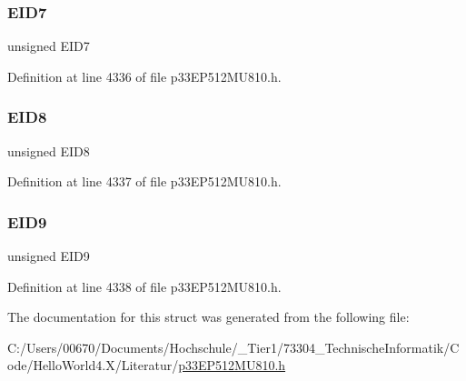 \subsubsection{\texorpdfstring{E\+I\+D7}{EID7}}
{\footnotesize\ttfamily unsigned E\+I\+D7}



Definition at line 4336 of file p33\+E\+P512\+M\+U810.\+h.

\mbox{\label{structtag_c1_r_x_f10_e_i_d_b_i_t_s_acca25e0b7d86eb499d01f85222baea87}} 
\subsubsection{\texorpdfstring{E\+I\+D8}{EID8}}
{\footnotesize\ttfamily unsigned E\+I\+D8}



Definition at line 4337 of file p33\+E\+P512\+M\+U810.\+h.

\mbox{\label{structtag_c1_r_x_f10_e_i_d_b_i_t_s_ac6748f73d4ada8538b06548be4f396c2}} 
\subsubsection{\texorpdfstring{E\+I\+D9}{EID9}}
{\footnotesize\ttfamily unsigned E\+I\+D9}



Definition at line 4338 of file p33\+E\+P512\+M\+U810.\+h.



The documentation for this struct was generated from the following file\+:\begin{DoxyCompactItemize}
\item 
C\+:/\+Users/00670/\+Documents/\+Hochschule/\+\_\+\+Tier1/73304\+\_\+\+Technische\+Informatik/\+Code/\+Hello\+World4.\+X/\+Literatur/\hyperlink{p33_e_p512_m_u810_8h}{p33\+E\+P512\+M\+U810.\+h}\end{DoxyCompactItemize}
